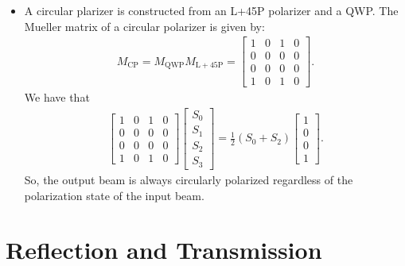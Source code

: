 \documentclass[10pt]{article}
\begin{document}
\begin{itemize}
		\item A circular plarizer is constructed from an L+45P polarizer and a QWP.  The Mueller matrix of a circular polarizer is given by:
		\begin{align*}
			M_{\mathrm{CP}} 
			= M_{\mathrm{QWP}} M_{\mathrm{L+45P}}
			= \begin{bmatrix}
				1 & 0 & 1 & 0 \\
				0 & 0 & 0 & 0 \\
				0 & 0 & 0 & 0 \\
				1 & 0 & 1 & 0 
			\end{bmatrix}.
		\end{align*}
		We have that
		\begin{align*}
			\begin{bmatrix}
				1 & 0 & 1 & 0 \\
				0 & 0 & 0 & 0 \\
				0 & 0 & 0 & 0 \\
				1 & 0 & 1 & 0 
			\end{bmatrix}
			\begin{bmatrix}
				S_0 \\
				S_1 \\
				S_2 \\
				S_3
			\end{bmatrix}
			= \frac{1}{2} (S_0 + S_2) \begin{bmatrix}
				1 \\ 0 \\ 0 \\ 1
			\end{bmatrix}.
		\end{align*}
		So, the output beam is always circularly polarized regardless of the polarization state of the input beam.
	\end{itemize}

	\section{Reflection and Transmission}
\end{document}
